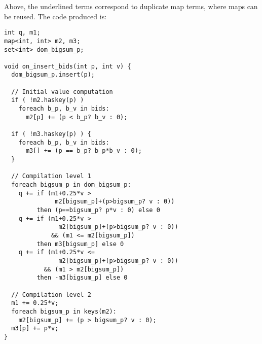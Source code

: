 Above, the underlined terms correspond to duplicate map terms, where maps can be
reused. The code produced is:

\begin{verbatim}
int q, m1;
map<int, int> m2, m3;
set<int> dom_bigsum_p;

void on_insert_bids(int p, int v) {
  dom_bigsum_p.insert(p);

  // Initial value computation
  if ( !m2.haskey(p) )
    foreach b_p, b_v in bids:
      m2[p] += (p < b_p? b_v : 0);

  if ( !m3.haskey(p) ) {
    foreach b_p, b_v in bids:
      m3[] += (p == b_p? b_p*b_v : 0);
  }

  // Compilation level 1
  foreach bigsum_p in dom_bigsum_p:
    q += if (m1+0.25*v >
              m2[bigsum_p]+(p>bigsum_p? v : 0))
         then (p==bigsum_p? p*v : 0) else 0
    q += if (m1+0.25*v >
               m2[bigsum_p]+(p>bigsum_p? v : 0))
             && (m1 <= m2[bigsum_p])
         then m3[bigsum_p] else 0
    q += if (m1+0.25*v <=
               m2[bigsum_p]+(p>bigsum_p? v : 0))
           && (m1 > m2[bigsum_p])
         then -m3[bigsum_p] else 0

  // Compilation level 2
  m1 += 0.25*v;
  foreach bigsum_p in keys(m2):
    m2[bigsum_p] += (p > bigsum_p? v : 0);
  m3[p] += p*v;
}
\end{verbatim}

